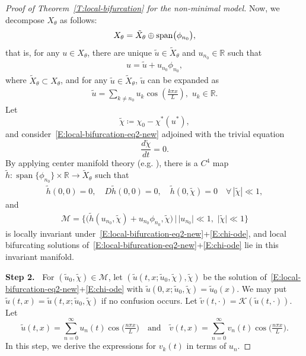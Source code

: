 \documentclass[11pt]{article} %
\theoremstyle{remark}
\theoremstyle{remark}
\numberwithin{equation}{section}
\numberwithin{figure}{section}
\numberwithin{table}{section}
\begin{document}
\begin{proof}[Proof of Theorem~\ref{T:local-bifurcation}  for the non-minimal model]
  Now, we decompose $X_\theta$ as follows:
  \begin{align*}
    X_\theta=\tilde{X}_\theta\oplus {\rm span}\big(\phi_{n_0}\big),
  \end{align*}
  that is, for any $u \in X_\theta$, there are unique $\tilde{u} \in \tilde{X}_\theta$ and $u_{n_0} \in \mathbb{R}$ such that
  \begin{align*}
    u=\tilde{u}+u_{n_0}\phi_{n_0},
  \end{align*}
  where $\tilde{X}_\theta \subset X_\theta$, and for any $\tilde{u} \in \tilde{X}_\theta$, $\tilde{u}$ can be expanded as
  \begin{align*}
    \tilde{u}=\sum_{k\not= n_0} u_k\cos(\tfrac{k\pi x}{L}),\,\,
    u_k\in\mathbb{R}.
  \end{align*}
  Let
  \begin{equation}\label{E:tilde-chi}
    \tilde{\chi} \coloneqq \chi_0 - \chi^*(u^*),
  \end{equation}
  and consider~\eqref{E:local-bifurcation-eq2-new} adjoined with the trivial
  equation
  \begin{equation}\label{E:chi-ode}
    \frac{d \tilde{\chi}}{dt}=0.
  \end{equation}
  By applying center manifold theory (e.g. \cite[Theorems~6.1.7
  and~6.2.1]{henry:81:geometric}), there is a $C^4$ map $\tilde{h}:
  \operatorname{span}\{\phi_{n_0}\}\times\mathbb{R} \to \tilde{X}_\theta$ such
  that
  \begin{align*}
    \tilde{h}(0,0)=0, \quad D\tilde{h}(0,0)=0, \quad { \tilde{h}(0,\tilde{\chi})=0\quad \forall\, |\tilde{\chi}|\ll 1,}
  \end{align*}
  and
  \begin{align}\label{E:center-manifold-eq}
    \mathcal{M}=\{\big(\tilde{h}(u_{n_0},\tilde{\chi})+u_{n_0}\phi_{n_0},\tilde{\chi}\big)\,|\, |u_{n_0}|\ll
    1,\,\, |\tilde{\chi}|\ll 1\}
  \end{align}
  is locally invariant
  under~\eqref{E:local-bifurcation-eq2-new}+\eqref{E:chi-ode}, and local
  bifurcating solutions
  of~\eqref{E:local-bifurcation-eq2-new}+\eqref{E:chi-ode} lie in this
  invariant manifold.


  \smallskip


  \noindent\textbf{Step 2.~} For $(\tilde{u}_0,\tilde{\chi}) \in \mathcal{M}$, let
  $(\tilde{u}(t, x;\tilde{u}_0, \tilde{\chi}),\tilde{\chi})$ be the solution
  of~\eqref{E:local-bifurcation-eq2-new}+\eqref{E:chi-ode} with $\tilde{u}(0,
  x;\tilde{u}_0, \tilde{\chi}) = \tilde{u}_0(x)$. We may put $\tilde{u}(t, x) =
  \tilde{u}(t, x;\tilde{u}_0, \tilde{\chi})$ if no confusion occurs. Let $\tilde{v}(t, \cdot) = \mathcal{K}(\tilde{u}(t, \cdot))$. Let
  \begin{equation}\label{E:local-bifurcation-eq4}
    \tilde{u}(t,x) = \sum_{n=0}^\infty u_n(t)\cos\Big(\tfrac{n\pi x}{L}\Big) \quad \text{and} \quad
    \tilde{v}(t,x) = \sum_{n=0}^\infty v_n(t)\cos\Big(\tfrac{n\pi x}{L}\Big).
  \end{equation}
  In this step, we derive the expressions for $v_k(t)$ in terms of $u_n$.


\end{proof}
\end{document}
